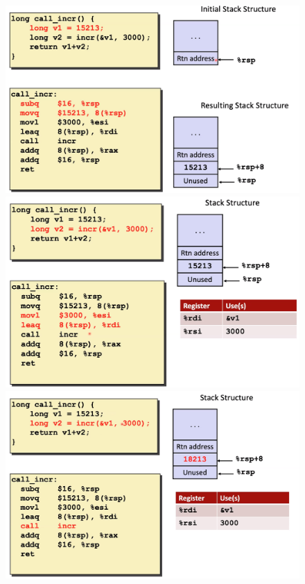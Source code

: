 \documentclass[12pt]{book}
\begin{document}
\begin{figure}[h]
        \centering
        \includegraphics[scale = 0.1]{./figures/incr1}
        \includegraphics[scale = 0.1]{./figures/incr2}
        \includegraphics[scale = 0.1]{./figures/incr3}

\end{figure}
\end{document}
